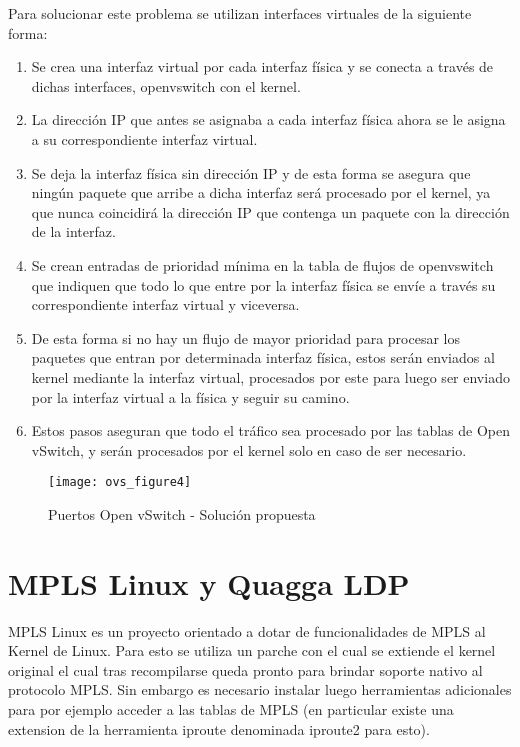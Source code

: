 \begin{enumerate}
Para solucionar este problema se utilizan interfaces virtuales de la siguiente forma:

\begin{enumerate}
\item Se crea una interfaz virtual por cada interfaz física y se conecta a través de dichas interfaces,  openvswitch con el kernel.

\item La dirección IP que antes se asignaba a cada interfaz física ahora se le asigna a su correspondiente interfaz virtual.

\item Se deja la interfaz física sin dirección IP y de esta forma se asegura que ningún paquete que arribe a dicha interfaz será procesado por el kernel, ya que nunca coincidirá la dirección IP que contenga un paquete con la dirección de la interfaz.

\item Se crean entradas de prioridad mínima en la tabla de flujos de openvswitch que indiquen que todo lo que entre por la interfaz física se envíe a través su correspondiente interfaz virtual y viceversa.

\item De esta forma si no hay un flujo de mayor prioridad para procesar los paquetes que entran por determinada interfaz física, estos serán enviados al kernel mediante la interfaz virtual, procesados por este para luego ser enviado por la interfaz virtual a la física y seguir su camino.

\item Estos pasos aseguran que todo el tráfico sea procesado por las tablas de Open vSwitch, y serán procesados por el kernel solo en caso de ser necesario.
\end{enumerate}

\begin{figure}[h] 
\centering    
\texttt{[image: ovs\_figure4]}
\caption[Puertos Open vSwitch - Soluci\'on propuesta]{Puertos Open vSwitch - Soluci\'on propuesta}
\label{fig:OVSInterfaces2}
\end{figure}

\end{enumerate}

\section{MPLS Linux y Quagga LDP}
\label{apendiceB6}

MPLS Linux\cite{MplsLinux1} es un proyecto orientado a dotar de funcionalidades de MPLS al Kernel de Linux. 
Para esto se utiliza un parche con el cual se extiende el kernel original el cual tras recompilarse queda pronto para brindar soporte nativo al protocolo MPLS. Sin embargo es necesario instalar luego herramientas adicionales para por ejemplo acceder a las tablas de MPLS (en particular existe una extension de la herramienta iproute denominada iproute2 para esto).\\

